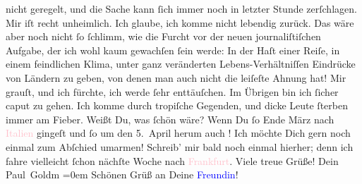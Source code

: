                nicht geregelt, und die {\pb}Sache kann ſich immer noch
               in letzter Stunde zerſchlagen.\pend
           \pstart
           Mir iſt recht unheimlich. Ich glaube, ich komme nicht lebendig zurück. Das wäre aber
               noch nicht ſo ſchlimm, wie die Furcht vor der neuen journaliſtiſchen Aufgabe, der ich \strikeout{\textcolor{gray}{×}}
               wohl kaum gewachſen ſein werde: In der Haſt einer Reiſe, in einem feindlichen Klima,
               unter ganz veränderten Lebens-Verhältniſſen Eindrücke von Ländern zu geben, \strikeout{\textcolor{gray}{×}}{ } von denen man auch nicht die
               leiſeſte Ahnung hat! Mir grauſt, und ich fürchte, ich werde ſehr enttäuſchen. Im
               Übrigen bin ich ſicher caput zu gehen. Ich komme durch tropiſche {\pb}Gegenden, und dicke Leute ſterben immer am
               Fieber.\pend
           \pstart
           Weißt Du, was ſchön wäre? Wenn Du ſo \strikeout{\textcolor{gray}{An}} Ende März nach \textcolor{pink}{Italien}{}\ledrightnote{\textcolor{pink}{Italien}} gingeſt und ſo um den 5. April herum
               auch \label{K_L02841-4v}\label{K_L02841-4h}! Ich
               möchte Dich gern noch einmal zum Abſchied umarmen!\pend
           \pstart
           Schreib’ mir bald noch einmal hierher; denn ich fahre vielleicht ſchon nächſte Woche
               nach \textcolor{pink}{Frankfurt}{}\ledrightnote{\textcolor{pink}{Frankfurt am Main}}.\pend
           \pstart
           Viele treue Grüße!\pend
           \pstart
           Dein {\\[\baselineskip]}\spacefill\mbox{Paul Goldm}\pend
           \leftskip=0em{}\pstart
           \noindent{}Schönen Grüß an Deine \textcolor{blue}{Freundin}{}!\pend
           \endnumbering{}\begin{anhang}\end{anhang}
      